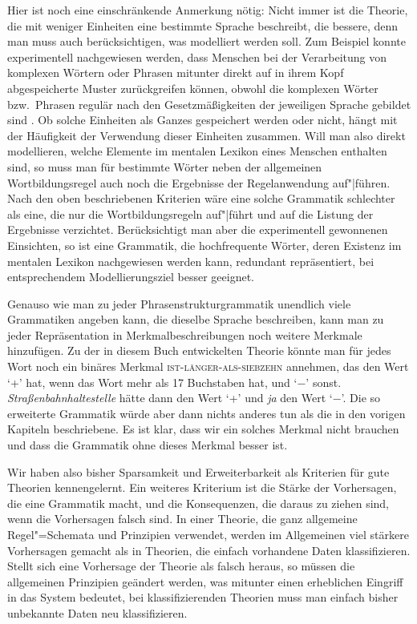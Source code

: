 Hier ist noch eine einschränkende Anmerkung nötig: Nicht immer ist die Theorie, die mit weniger
Einheiten eine bestimmte Sprache beschreibt, die bessere, denn man muss auch berücksichtigen,
was modelliert werden soll. Zum Beispiel konnte experimentell nachgewiesen werden, dass
Menschen bei der Verarbeitung von komplexen Wörtern oder Phrasen mitunter direkt auf in ihrem
Kopf abgespeicherte Muster zurückgreifen können, obwohl die komplexen Wörter bzw.\ Phrasen
regulär nach den Gesetzmäßigkeiten der jeweiligen Sprache gebildet sind \parencites{Bybee95a-u}[228--229]{PJ2005a}[64]{Goldberg2006a}. Ob solche Einheiten
als Ganzes gespeichert werden oder nicht, hängt mit der Häufigkeit der Verwendung dieser
Einheiten zusammen. Will man also direkt modellieren, welche Elemente im mentalen Lexikon eines
Menschen enthalten sind, so muss man für bestimmte Wörter neben der allgemeinen Wortbildungsregel
auch noch die Ergebnisse der Regelanwendung auf"|führen. Nach den oben beschriebenen Kriterien
wäre eine solche Grammatik schlechter als eine, die nur die Wortbildungsregeln auf"|führt
und auf die Listung der Ergebnisse verzichtet. Berücksichtigt man aber die experimentell gewonnenen
Einsichten, so ist eine Grammatik, die hochfrequente Wörter, deren Existenz im mentalen Lexikon
nachgewiesen werden kann, redundant repräsentiert, bei entsprechendem Modellierungsziel besser geeignet.

Genauso wie man zu jeder Phrasenstrukturgrammatik unendlich viele Grammatiken angeben kann,
die dieselbe Sprache beschreiben,
kann man zu jeder Repräsentation in Merkmalbeschreibungen noch weitere Merkmale hinzufügen. Zu der
in diesem Buch entwickelten Theorie könnte man für jedes Wort noch ein binäres
Merkmal \textsc{ist-länger-als-siebzehn} annehmen, das den Wert `+' hat, wenn das Wort mehr als 17 Buchstaben
hat, und `$-$' sonst. \emph{Straßenbahnhaltestelle} hätte dann den Wert `+' und \emph{ja} den Wert `$-$'.
Die so erweiterte Grammatik würde aber dann nichts anderes tun als die in den vorigen Kapiteln
beschriebene. Es ist klar, dass wir ein solches Merkmal nicht brauchen und dass die Grammatik
ohne dieses Merkmal besser ist.

Wir haben also bisher Sparsamkeit und Erweiterbarkeit als Kriterien für gute Theorien
kennengelernt. Ein weiteres Kriterium ist die Stärke der Vorhersagen, die eine Grammatik macht,
und die Konsequenzen, die daraus zu ziehen sind, wenn die Vorhersagen falsch sind.
In einer Theorie, die ganz allgemeine Regel"=Schemata und Prinzipien verwendet, werden im Allgemeinen
viel stärkere Vorhersagen gemacht als in Theorien, die einfach vorhandene Daten klassifizieren.
Stellt sich eine Vorhersage der Theorie als falsch heraus, so müssen die allgemeinen Prinzipien
geändert werden, was mitunter einen erheblichen Eingriff in das System bedeutet,
bei klassifizierenden Theorien muss man einfach bisher unbekannte Daten neu klassifizieren.

